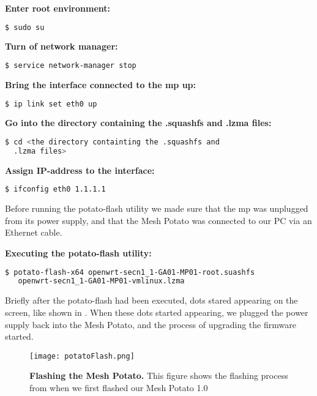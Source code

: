 \begin{framed}
\noindent \textbf{Enter root environment:} 
\begin{lstlisting}[language=bash]
  $ sudo su
\end{lstlisting}

\noindent \textbf{Turn of network manager:}
\begin{lstlisting}[language=bash]
  $ service network-manager stop
\end{lstlisting}

\noindent \textbf{Bring the interface connected to the \gls{mp} up:}
\begin{lstlisting}[language=bash]
  $ ip link set eth0 up
\end{lstlisting}

\noindent \textbf{Go into the directory containing the .squashfs and .lzma files:}
\begin{lstlisting}[language=bash]
  $ cd <the directory containting the .squashfs and 
  .lzma files>
\end{lstlisting}

\noindent \textbf{Assign IP-address to the interface:}
\begin{lstlisting}[language=bash]
  $ ifconfig eth0 1.1.1.1
\end{lstlisting}

Before running the potato-flash utility we made sure that the \gls{mp} was unplugged from its power supply, and that the Mesh Potato was connected to our PC via an Ethernet cable. 

\noindent \textbf{Executing the potato-flash utility:}
\begin{lstlisting}[language=bash]
  $ potato-flash-x64 openwrt-secn1_1-GA01-MP01-root.suashfs 
   openwrt-secn1_1-GA01-MP01-vmlinux.lzma
\end{lstlisting}
\end{framed}

Briefly after the potato-flash had been executed, dots stared appearing on the screen, like shown in . When these dots started appearing, we plugged the power supply back into the Mesh Potato, and the process of upgrading the firmware started. 

\begin{figure}[t]
  \centering
      \texttt{[image: potatoFlash.png]}
  \caption [Flashing the Mesh Potato]{\textbf{Flashing the Mesh Potato.} This figure shows the flashing process from when we first flashed our Mesh Potato 1.0}
  \label{fig:flashing}
\end{figure}


